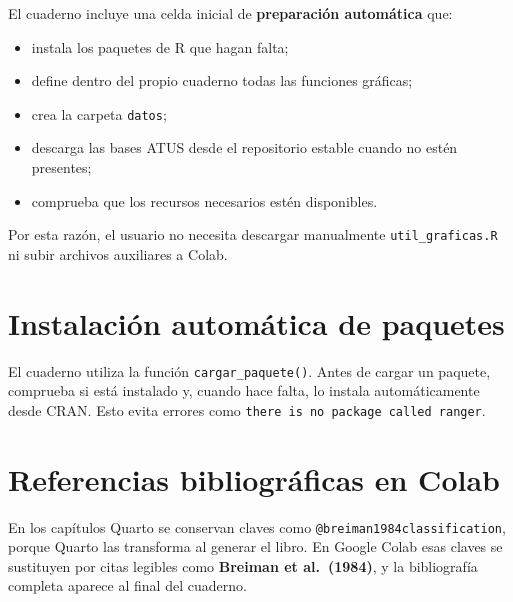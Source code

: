 \documentclass[
  spanish,
  10.5pt,
  letterpaper,
  openany,
  headings=big]{scrbook}
\providecommand{\tightlist}{%
  \setlength{\itemsep}{0pt}\setlength{\parskip}{0pt}}
\begin{document}

El cuaderno incluye una celda inicial de \textbf{preparación automática}
que:

\begin{itemize}
\tightlist
\item
  instala los paquetes de R que hagan falta;
\item
  define dentro del propio cuaderno todas las funciones gráficas;
\item
  crea la carpeta \texttt{datos};
\item
  descarga las bases ATUS desde el repositorio estable cuando no estén
  presentes;
\item
  comprueba que los recursos necesarios estén disponibles.
\end{itemize}

Por esta razón, el usuario no necesita descargar manualmente
\texttt{util\_graficas.R} ni subir archivos auxiliares a Colab.

\section*{Instalación automática de
paquetes}\label{instalaciuxf3n-automuxe1tica-de-paquetes}


El cuaderno utiliza la función \texttt{cargar\_paquete()}. Antes de
cargar un paquete, comprueba si está instalado y, cuando hace falta, lo
instala automáticamente desde CRAN. Esto evita errores como
\texttt{there\ is\ no\ package\ called\ \textquotesingle{}ranger\textquotesingle{}}.

\section*{Referencias bibliográficas en
Colab}\label{referencias-bibliogruxe1ficas-en-colab}


En los capítulos Quarto se conservan claves como
\texttt{@breiman1984classification}, porque Quarto las transforma al
generar el libro. En Google Colab esas claves se sustituyen por citas
legibles como \textbf{Breiman et al.~(1984)}, y la bibliografía completa
aparece al final del cuaderno.
\end{document}

